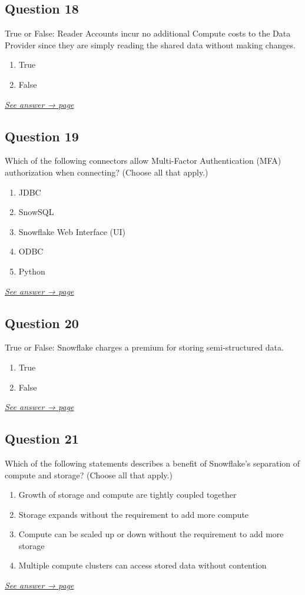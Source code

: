 \documentclass[12pt]{article}
\newcommand{\seeanswer}[1]{%
  \par\smallskip\emph{\hyperref[ans:#1]{See answer → page \pageref{ans:#1}}}%
}
\begin{document}
\subsection*{Question 18}\label{q:18}
True or False: Reader Accounts incur no additional Compute costs to the Data Provider since they are simply reading the shared data without making changes.

\begin{enumerate}[label=\Alph*.]
  \item True
  \item False
\end{enumerate}
\seeanswer{18}

\subsection*{Question 19}\label{q:19}
Which of the following connectors allow Multi-Factor Authentication (MFA) authorization when connecting? (Choose all that apply.)

\begin{enumerate}[label=\Alph*.]
  \item JDBC
  \item SnowSQL
  \item Snowflake Web Interface (UI)
  \item ODBC
  \item Python
\end{enumerate}
\seeanswer{19}

\subsection*{Question 20}\label{q:20}
True or False: Snowflake charges a premium for storing semi-structured data.

\begin{enumerate}[label=\Alph*.]
  \item True
  \item False
\end{enumerate}
\seeanswer{20}

\subsection*{Question 21}\label{q:21}
Which of the following statements describes a benefit of Snowflake's separation of compute and storage? (Choose all that apply.)

\begin{enumerate}[label=\Alph*.]
  \item Growth of storage and compute are tightly coupled together
  \item Storage expands without the requirement to add more compute
  \item Compute can be scaled up or down without the requirement to add more storage
  \item Multiple compute clusters can access stored data without contention
\end{enumerate}
\seeanswer{21}
\end{document}
